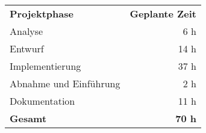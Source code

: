 \begin{tabular}{lr}
\rowcolor{heading}\textbf{Projektphase} & \textbf{Geplante Zeit} \\
Analyse & 6 h \\
\rowcolor{odd}Entwurf & 14 h \\
Implementierung & 37 h \\
\rowcolor{odd}Abnahme und Einführung & 2 h \\
Dokumentation & 11 h \\
\hline
\hline
\rowcolor{heading}\textbf{Gesamt} & \textbf{70 h} \\
\end{tabular}

